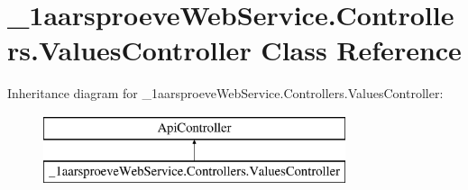 \hypertarget{class__1aarsproeve_web_service_1_1_controllers_1_1_values_controller}{}\section{\+\_\+1aarsproeve\+Web\+Service.\+Controllers.\+Values\+Controller Class Reference}
\label{class__1aarsproeve_web_service_1_1_controllers_1_1_values_controller}
Inheritance diagram for \+\_\+1aarsproeve\+Web\+Service.\+Controllers.\+Values\+Controller\+:\begin{figure}[H]
\begin{center}
\leavevmode
\includegraphics[height=2.000000cm]{class__1aarsproeve_web_service_1_1_controllers_1_1_values_controller}
\end{center}
\end{figure}
